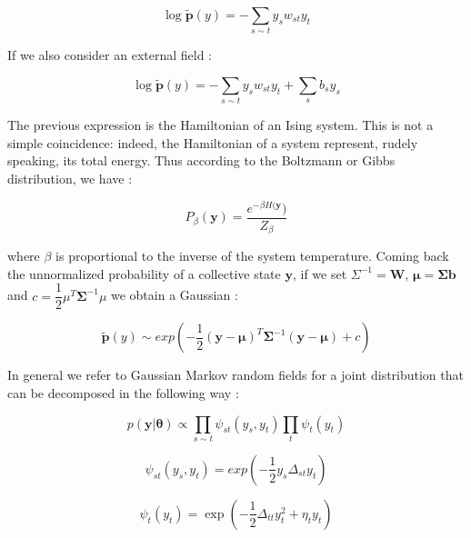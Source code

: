 \documentclass[12pt,%
               a4paper,%
               oneside,openany,%
               titlepage,%
               headinclude,footinclude,%
               BCOR5mm,%
               cleardoublepage=empty,%
               tablecaptionabove,%
               floatperchapter,
               ]{scrreprt}                 %
\begin{document}
\begin{equation}
\log\tilde{\textbf{p}}(y)= -\sum_{s\sim t}y_{s}w_{st}y_{t}
\end{equation}

If we also consider an external field \cite{murphy2012machine}:

\begin{equation}
\log\tilde{\textbf{p}}(y)= -\sum_{s\sim t}y_{s}w_{st}y_{t}+\sum_{s}b_{s}y_{s}
\end{equation}

The previous expression is the Hamiltonian of an Ising system. This is not a simple coincidence:  indeed, the Hamiltonian of a system represent,  rudely speaking,  its total energy.  Thus according to the Boltzmann or Gibbs distribution, we have \cite{murphy2012machine}:

\begin{equation}
P_{\beta}(\textbf{y})=\dfrac{e^{-\beta H(\textbf{y}})}{Z_{\beta}}
\end{equation}

where $\beta$ is proportional to the inverse of the system temperature.  Coming back the unnormalized probability of a collective state $\textbf{y}$,  if we set $\Sigma^{-1}=\textbf{W}$,  $\boldsymbol{\mu}=\boldsymbol{\Sigma} \textbf{b}$ and $c=\dfrac{1}{2}\mu^{T}\boldsymbol{\Sigma}^{-1}\mu$ we obtain a Gaussian \cite{murphy2012machine}:

\begin{equation}
\tilde{\textbf{p}}(y)\sim exp\left( -\frac{1}{2} (\textbf{y}-\boldsymbol{\mu})^{T} \boldsymbol{\Sigma}^{-1} (\textbf{y}-\boldsymbol{\mu}) + c \right)
\end{equation}

In general we refer to Gaussian Markov random fields for a joint distribution that can be decomposed in the following way \cite{murphy2012machine}:

\begin{equation}
p\left(\textbf{y}|\boldsymbol{\theta}\right) \propto \prod_{s\sim t} \psi_{st}\left(y_{s},y_{t}\right)\prod_{t}\psi_{t}\left(y_{t}\right)
\end{equation}

\begin{equation}
\psi_{st}\left( y_{s},y_{t} \right)=exp\left( -\dfrac{1}{2} y_{s}\Delta_{st}y_{t} \right)
\end{equation}

\begin{equation}
\psi_{t}\left(y_{t}\right)= \exp \left( -\dfrac{1}{2}\Delta_{tt}y^{2}_{t}+\eta_{t}y_{t}\right)
\end{equation}
\end{document}
